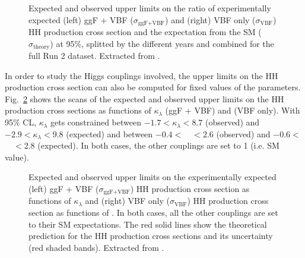 \documentclass[../main.tex]{subfiles}
\begin{document}
\begin{figure}[h!]
\begin{center}
\end{center}
\caption{Expected and observed upper limits on the ratio of experimentally expected (left) ggF + VBF ($\sigma_{\text{ggF+VBF}}$) and (right) VBF only ($\sigma_{\text{VBF}}$) HH production cross section and the expectation from the SM ($\sigma_\text{theory}$) at 95\%, splitted by the different years and combined for the full Run 2 dataset. Extracted from \cite{hh:analysis:run2}.}
\label{hh:fig:limits_r}
\end{figure}

In order to study the Higgs couplings involved, the upper limits on the HH production cross section can also be computed for fixed values of the parameters. Fig.~\ref{hh:fig:limits_r} shows the scans of the expected and observed upper limits on the HH production cross sections as functions of $\kappa_\lambda$ (ggF + VBF) and \kvv{} (VBF only). With 95\% CL, $\kappa_\lambda$ gets constrained between $ -1.7 <\kappa_\lambda < 8.7$ (observed) and $-2.9 < \kappa_\lambda < 9.8$ (expected) and \kvv{} between $-0.4 <$~\kvv{}~$< 2.6$ (observed) and $-0.6<$~\kvv{}~$<  2.8$ (expected). In both cases, the other couplings are set to 1 (i.e. SM value).

\begin{figure}[h!]
\begin{center}
\end{center}
\caption{Expected and observed upper limits on the experimentally expected (left) ggF + VBF ($\sigma_{\text{ggF+VBF}}$) HH production cross section as functions of $\kappa_\lambda$ and (right) VBF only ($\sigma_{\text{VBF}}$) HH production cross section as functions of \kvv. In both cases, all the other couplings are set to their SM expectations. The red solid lines show the theoretical prediction for the HH production cross sections and its uncertainty (red shaded bands). Extracted from \cite{hh:analysis:run2}.}
\label{hh:fig:limits_r}
\end{figure}
\end{document}
